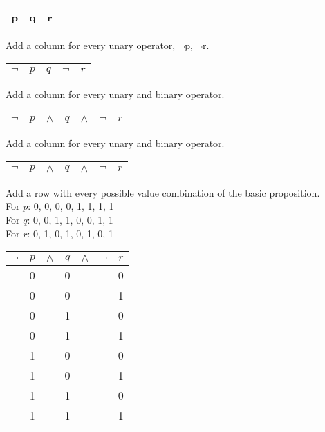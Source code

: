 \documentclass[10pt,a4paper,draft,titlepage,onecolumn]{book}
\begin{document}
\begin{center}
\begin{tabular}{ |c|c|c| }
 \hline
 p & q & r \\
 \hline
\end{tabular}
\end{center}
Add a column for every unary operator, {$\neg$}p, {$\neg$}r.\\
\begin{center}
\begin{tabular}{ |c|c|c|c|c|}
 \hline
 {$\neg$} & $p$ &$q$& {$\neg$}&$r$ \\
 \hline
\end{tabular}
\end{center}
Add a column for every unary and binary operator.
\begin{center}
\begin{tabular}{ |c|c|c|c|c|c|c|}
 \hline
 {$\neg$} & $p$ &{$\wedge$}&$q$&{$\wedge$} & {$\neg$}&$r$ \\
 \hline
\end{tabular}
\end{center}
Add a column for every unary and binary operator.
\begin{center}
\begin{tabular}{ |c|c|c|c|c|c|c|}
 \hline
 {$\neg$} & $p$ &{$\wedge$}&$q$&{$\wedge$} & {$\neg$}&$r$ \\
 \hline
\end{tabular}
\end{center}
Add a row with every possible value combination of the basic proposition. \\
For $p$: 0, 0, 0, 0, 1, 1, 1, 1\\
For $q$: 0, 0, 1, 1, 0, 0, 1, 1\\
For $r$: 0, 1, 0, 1, 0, 1, 0, 1\\
\begin{center}
\begin{tabular}{ |c|c|c|c|c|c|c| }
\hline
 {$\neg$} & $p$ & {$\wedge$} & $q$ & {$\wedge$} & {$\neg$}  & $r$ \\
\hline
          & 0   &            & 0   &            &           &0\\
          & 0   &            & 0   &            &           &1\\
          & 0   &            & 1   &            &           &0\\
          & 0   &            & 1   &            &           &1\\
          & 1   &            & 0   &            &           &0\\
          & 1   &            & 0   &            &           &1\\
          & 1   &            & 1   &            &           &0\\
          & 1   &            & 1   &            &           &1\\
 \hline
\end{tabular}
\end{center}
\end{document}
